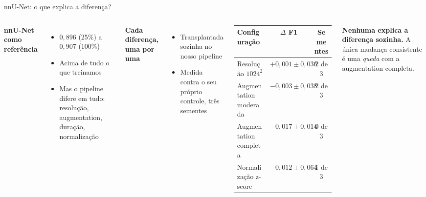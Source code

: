 \documentclass[aspectratio=169]{beamer}
\begin{document}
\begin{frame}{nnU-Net: o que explica a diferença?}
  \begin{columns}[T,totalwidth=\textwidth]
      \textbf{nnU-Net como referência}
      \begin{itemize}\footnotesize
        \item $0,896$ (25\%) a $0,907$ (100\%)
        \item Acima de tudo o que treinamos
        \item Mas o pipeline difere em tudo: resolução, augmentation, duração, normalização
      \end{itemize}

      \bigskip
      \textbf{Cada diferença, uma por uma}
      \begin{itemize}\footnotesize
        \item Transplantada sozinha no nosso pipeline
        \item Medida contra o seu próprio controle, três sementes
      \end{itemize}

      \centering
      \footnotesize
      \begin{tabular}{@{}lcc@{}}
        \toprule
        \textbf{Configuração} & \textbf{$\Delta$ F1} & \textbf{Sementes} \\
        \midrule
        Resolução $1024^2$        & $+0,001 \pm 0,036$ & 2 de 3 \\
        Augmentation moderada     & $-0,003 \pm 0,038$ & 2 de 3 \\
        Augmentation completa     & $-0,017 \pm 0,014$ & 0 de 3 \\
        Normalização z-score      & $-0,012 \pm 0,064$ & 1 de 3 \\
        \bottomrule
      \end{tabular}

      \vspace{0.8em}
      \footnotesize
      \textbf{Nenhuma explica a diferença sozinha.}
      A única mudança consistente é uma \emph{queda} com a augmentation completa.
  \end{columns}

\end{frame}
\end{document}
